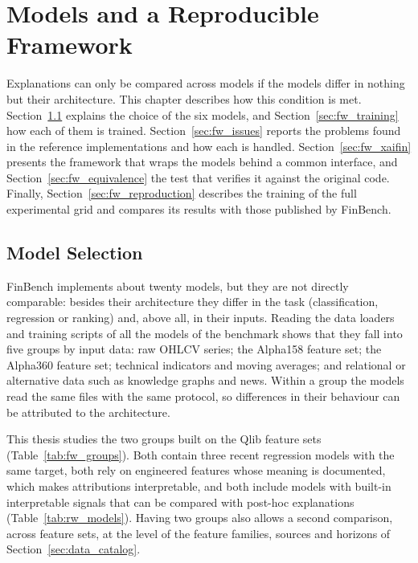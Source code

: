 
\chapter{Models and a Reproducible Framework}
\label{ch:framework}

Explanations can only be compared across models if the models differ in nothing but their architecture. This chapter describes how this condition is met. Section~\ref{sec:fw_selection} explains the choice of the six models, and Section~\ref{sec:fw_training} how each of them is trained. Section~\ref{sec:fw_issues} reports the problems found in the reference implementations and how each is handled. Section~\ref{sec:fw_xaifin} presents the framework that wraps the models behind a common interface, and Section~\ref{sec:fw_equivalence} the test that verifies it against the original code. Finally, Section~\ref{sec:fw_reproduction} describes the training of the full experimental grid and compares its results with those published by FinBench.

\section{Model Selection}
\label{sec:fw_selection}

FinBench implements about twenty models, but they are not directly comparable: besides their architecture they differ in the task (classification, regression or ranking) and, above all, in their inputs. Reading the data loaders and training scripts of all the models of the benchmark shows that they fall into five groups by input data: raw OHLCV series; the Alpha158 feature set; the Alpha360 feature set; technical indicators and moving averages; and relational or alternative data such as knowledge graphs and news. Within a group the models read the same files with the same protocol, so differences in their behaviour can be attributed to the architecture.

This thesis studies the two groups built on the Qlib feature sets (Table~\ref{tab:fw_groups}). Both contain three recent regression models with the same target, both rely on engineered features whose meaning is documented, which makes attributions interpretable, and both include models with built-in interpretable signals that can be compared with post-hoc explanations (Table~\ref{tab:rw_models}). Having two groups also allows a second comparison, across feature sets, at the level of the feature families, sources and horizons of Section~\ref{sec:data_catalog}.

